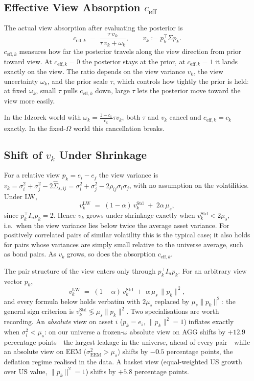 \documentclass[a4paper,11pt]{article}
\theoremstyle{plain}
\theoremstyle{definition}
\newcommand{\Std}{\mathrm{Std}}
\newcommand{\LW}{\mathrm{LW}}
\newcommand{\eff}{\mathrm{eff}}
\begin{document}
\subsection{Effective View Absorption $c_{\eff}$}
\label{sec:ceff}

The actual view absorption after evaluating the posterior is
\[
  c_{\eff,k} \;=\; \frac{\tau\,v_k}{\tau\,v_k + \omega_k},
  \qquad v_k := p_k^\top\Sigma p_k.
\]
$c_{\eff,k}$ measures how far the posterior travels along the view
direction from prior toward view. At $c_{\eff,k} = 0$ the posterior
stays at the prior, at $c_{\eff,k} = 1$ it lands exactly on the view.
The ratio depends on the view variance $v_k$, the view uncertainty
$\omega_k$, and the prior scale $\tau$, which controls how tightly the
prior is held: at fixed $\omega_k$, small $\tau$ pulls $c_{\eff,k}$
down, large $\tau$ lets the posterior move toward the view more easily.

In the Idzorek world with $\omega_k = \tfrac{1-c_k}{c_k}\tau v_k$, both
$\tau$ and $v_k$ cancel and $c_{\eff,k} = c_k$ exactly. In the
fixed-$\Omega$ world this cancellation breaks.

\subsection{Shift of $v_k$ Under Shrinkage}
\label{sec:vk-shift}

For a relative view $p_k = e_i - e_j$ the view variance is
$v_k = \sigma_i^2 + \sigma_j^2 - 2\hat\Sigma_{s,ij}
     = \sigma_i^2 + \sigma_j^2 - 2\rho_{ij}\sigma_i\sigma_j$,
with no assumption on the volatilities. Under LW,
\[
  v_k^{\LW} \;=\; (1 - \alpha)\,v_k^\Std \;+\; 2\alpha\,\mu_s,
\]
since $p_k^\top I_n p_k = 2$. Hence $v_k$ grows under shrinkage exactly
when $v_k^\Std < 2\mu_s$, i.e.\ when the view variance lies below twice
the average asset variance. For positively correlated pairs of similar
volatility this is the typical case; it also holds for pairs whose
variances are simply small relative to the universe average, such as
bond pairs. As $v_k$ grows, so does the absorption $c_{\eff,k}$.

The pair structure of the view enters only through $p_k^\top I_n p_k$.
For an arbitrary view vector $p_k$,
\[
  v_k^{\LW} \;=\; (1-\alpha)\,v_k^\Std \;+\; \alpha\,\mu_s\,\lVert p_k\rVert^2,
\]
and every formula below holds verbatim with $2\mu_s$ replaced by
$\mu_s\lVert p_k\rVert^2$: the general sign criterion is
$v_k^\Std \lessgtr \mu_s\lVert p_k\rVert^2$. Two specialisations are
worth recording. An \emph{absolute} view on asset $i$ ($p_k = e_i$,
$\lVert p_k\rVert^2 = 1$) inflates exactly when $\sigma_i^2 < \mu_s$:
on our universe a frozen-$\omega$ absolute view on AGG shifts by
$+12.9$ percentage points---the largest leakage in the universe, ahead
of every pair---while an absolute view on EEM
($\sigma_{\mathrm{EEM}}^2 > \mu_s$) shifts by $-0.5$ percentage
points, the deflation regime realised in the data. A basket view
(equal-weighted US growth over US value, $\lVert p_k\rVert^2 = 1$)
shifts by $+5.8$ percentage points.
\end{document}
